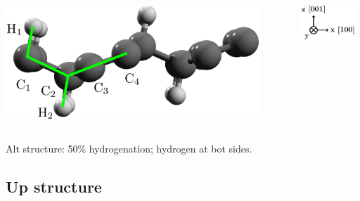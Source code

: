 \documentclass{beamer}
\begin{document}
\begin{frame}
\begin{columns}
\flushright
\includegraphics[width=0.9\textwidth]{figs/alt2.pdf}

\vspace{5mm}

\flushleft
\includegraphics[width=0.9\textwidth]{figs/arrows2.pdf}

\end{columns}

\vspace{-4mm}
\begin{center}
{\Large Alt structure:} 50\% hydrogenation; hydrogen at bot sides.
\end{center}

\end{frame}



\subsection{Up structure}
\end{document}
